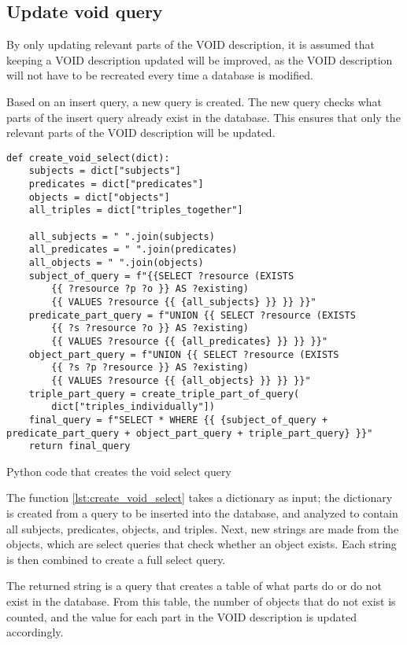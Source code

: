 \subsection{Update \gls{void} query}\label{sec:update-void-query}
By only updating relevant parts of the VOID description, it is assumed that keeping a VOID description updated will be improved, as the VOID description will not have to be recreated every time a database is modified.

Based on an insert query, a new query is created. The new query checks what parts of the insert query already exist in the database. This ensures that only the relevant parts of the VOID description will be updated.

\begin{listing}[htb!]
    \begin{verbatim}
def create_void_select(dict):
    subjects = dict["subjects"]
    predicates = dict["predicates"]
    objects = dict["objects"]
    all_triples = dict["triples_together"]

    all_subjects = " ".join(subjects)
    all_predicates = " ".join(predicates)
    all_objects = " ".join(objects)
    subject_of_query = f"{{SELECT ?resource (EXISTS 
        {{ ?resource ?p ?o }} AS ?existing) 
        {{ VALUES ?resource {{ {all_subjects} }} }} }}"
    predicate_part_query = f"UNION {{ SELECT ?resource (EXISTS 
        {{ ?s ?resource ?o }} AS ?existing)
        {{ VALUES ?resource {{ {all_predicates} }} }} }}"
    object_part_query = f"UNION {{ SELECT ?resource (EXISTS
        {{ ?s ?p ?resource }} AS ?existing) 
        {{ VALUES ?resource {{ {all_objects} }} }} }}"
    triple_part_query = create_triple_part_of_query(
        dict["triples_individually"])
    final_query = f"SELECT * WHERE {{ {subject_of_query + predicate_part_query + object_part_query + triple_part_query} }}"
    return final_query
    \end{verbatim}
    \caption{Python code that creates the \gls{void} select query}
    \label{lst:create_void_select}
\end{listing}

The function \autoref{lst:create_void_select} takes a dictionary as input; the dictionary is created from a query to be inserted into the database, and analyzed to contain all subjects, predicates, objects, and triples. Next, new strings are made from the objects, which are select queries that check whether an object exists. Each string is then combined to create a full select query.

The returned string is a query that creates a table of what parts do or do not exist in the database. From this table, the number of objects that do not exist is counted, and the value for each part in the VOID description is updated accordingly.

